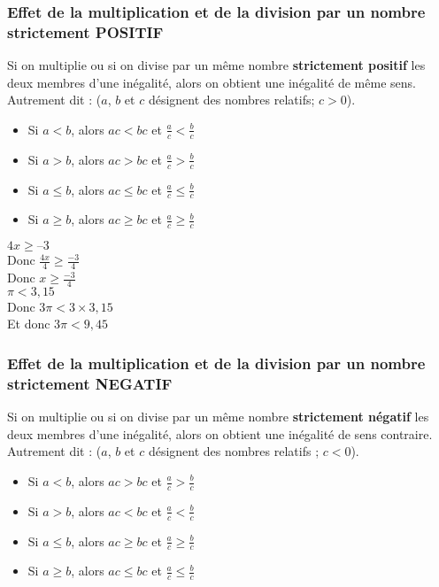 \documentclass[10pt]{article}
\begin{document}
{\subsubsection{Effet de la multiplication et de la division par un nombre strictement POSITIF} 
\begin{shaded}
\begin{Pp}
Si 	on multiplie ou si on divise par un même nombre \textbf{strictement positif} les deux membres d'une inégalité, alors 	on obtient une inégalité de même sens. Autrement dit : ($a$, $b$ et $c$ désignent des nombres relatifs; $c > 0$).
\begin{itemize}
\item Si $a<b$, alors $ac<bc$ et $\frac{a}{c} < \frac{b}{c}$    	
\item Si $a>b$, alors $ac>bc$ et $\frac{a}{c} > \frac{b}{c}$ 
\item Si $a\leqslant b$, alors $ac\leqslant bc$ et $\frac{a}{c}\leqslant \frac{b}{c}$
\item Si $a\geqslant b$, alors $ac\geqslant bc$ et $\frac{a}{c}\geqslant \frac{b}{c}$     	
\end{itemize}
\end{Pp}
\end{shaded}


\begin{Ex}	
\begin{multicols}{2}

$4x\geqslant –3$\\
Donc $\frac{4x}{4}\geqslant \frac{-3}{4}$\\
Donc $x\geqslant \frac{-3}{4}$\\

$\pi<3,15$\\
Donc $3 \pi<3 \times 3,15$\\
Et donc $3 \pi< 9,45$
\end{multicols}
\end{Ex}


\subsubsection{Effet de la multiplication et de la division par un nombre strictement NEGATIF}
\begin{shaded}
\begin{Pp}
Si 	on multiplie ou si on divise par un même nombre \textbf{strictement négatif} les deux membres d'une inégalité, alors on obtient une inégalité de sens contraire. Autrement dit : ($a$, $b$ et $c$ désignent des nombres relatifs ; $c < 0$).
\begin{itemize}
\item Si $a<b$, alors $ac>bc$ et $\frac{a}{c} > \frac{b}{c}$    	
\item Si $a>b$, alors $ac<bc$ et $\frac{a}{c} < \frac{b}{c}$ 
\item Si $a\leqslant b$, alors $ac\geqslant bc$ et $\frac{a}{c}\geqslant \frac{b}{c}$
\item Si $a\geqslant b$, alors $ac\leqslant bc$ et $\frac{a}{c}\leqslant \frac{b}{c}$
\end{itemize}	
\end{Pp}
\end{shaded}

}
\end{document}
